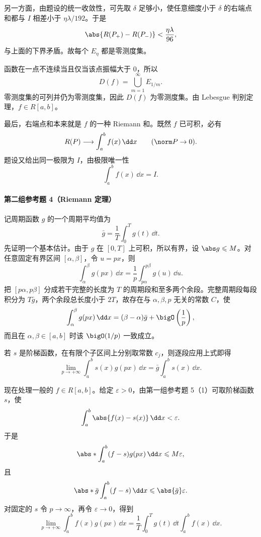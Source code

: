 \begin{xsolution}
另一方面，由题设的统一收敛性，可先取 $\delta$ 足够小，使任意细度小于 $\delta$ 的右端点和都与 $I$ 相差小于 $\eta\lambda/192$。于是
\[
  \abs{R(P_+)-R(P_-)}<\frac{\eta\lambda}{96},
\]
与上面的下界矛盾。故每个 $E_\eta$ 都是零测度集。

函数在一点不连续当且仅当该点振幅大于 $0$，所以
\[
  D(f)=\bigcup_{m=1}^\infty E_{1/m}.
\]
零测度集的可列并仍为零测度集，因此 $D(f)$ 为零测度集。由 Lebesgue 判别定理，$f\in R[a,b]$。

最后，右端点和本来就是 $f$ 的一种 Riemann 和。既然 $f$ 已可积，必有
\[
  R(P)\longrightarrow\int_a^b f(x)\,\dd x
  \qquad(\norm P\to0).
\]
题设又给出同一极限为 $I$，由极限唯一性
\[
  \boxed{\int_a^b f(x)\,\dd x=I}.
\]
\end{xsolution}

\paragraph{第二组参考题 4（Riemann 定理）}
\begin{xsolution}
记周期函数 $g$ 的一个周期平均值为
\[
  \bar g=\frac1T\int_0^Tg(t)\,\dd t.
\]
先证明一个基本估计。由于 $g$ 在 $[0,T]$ 上可积，所以有界，设 $\abs g\leqslant M$。对任意固定有界区间 $[\alpha,\beta]$，令 $u=px$，则
\[
  \int_\alpha^\beta g(px)\,\dd x
  =\frac1p\int_{p\alpha}^{p\beta}g(u)\,\dd u.
\]
把 $[p\alpha,p\beta]$ 分成若干完整的长度为 $T$ 的周期段和至多两个余段。完整周期段每段积分为 $T\bar g$，两个余段总长度小于 $2T$，故存在与 $\alpha,\beta,p$ 无关的常数 $C$，使
\[
  \int_\alpha^\beta g(px)\,\dd x
  =(\beta-\alpha)\bar g+\bigO\left(\frac1p\right),
\]
而且在 $\alpha,\beta\in[a,b]$ 时该 $\bigO(1/p)$ 一致成立。

若 $s$ 是阶梯函数，在有限个子区间上分别取常数 $c_j$，则逐段应用上式即得
\[
  \lim_{p\to+\infty}\int_a^b s(x)g(px)\,\dd x
  =\bar g\int_a^b s(x)\,\dd x.
\]

现在处理一般的 $f\in R[a,b]$。给定 $\varepsilon>0$，由第一组参考题 5（1）可取阶梯函数 $s$，使
\[
  \int_a^b\abs{f(x)-s(x)}\,\dd x<\varepsilon.
\]
于是
\[
  \abs*{\int_a^b(f-s)g(px)\,\dd x}
  \leqslant M\varepsilon,
\]
且
\[
  \abs*{\bar g\int_a^b(f-s)\,\dd x}
  \leqslant\abs{\bar g}\varepsilon.
\]
对固定的 $s$ 令 $p\to\infty$，再令 $\varepsilon\to0$，得到
\[
  \boxed{
  \lim_{p\to+\infty}\int_a^b f(x)g(px)\,\dd x
  =\frac1T\int_0^Tg(t)\,\dd t\int_a^b f(x)\,\dd x}.
\]
\end{xsolution}


